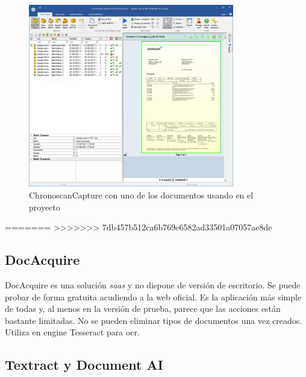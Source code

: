 \begin{figure}[hp!]
    \centering
    \includegraphics[width=0.8\textwidth]{imaxes/b-estado-arte/chronoscan-capture}
    \caption{ChronoscanCapture con uno de los documentos usando en el proyecto}
    \label{fig:chronoscan-capture}
\end{figure}
=======
>>>>>>> 7db457b512ca6b769e6582ad33501a07057ae8de

\subsection{DocAcquire}

DocAcquire \cite{solucionesComerciales_docAcquire_docAcquire} es una solución \emph{\acrlong{saas}} y no dispone de versión de escritorio. Se puede probar de forma gratuita acudiendo a la web oficial. Es la aplicación más simple de todas y, al menos en la versión de prueba, parece que las acciones están bastante limitadas. No se pueden eliminar tipos de documentos una vez creados. Utiliza en engine Tesseract para \acrshort{ocr}.

\subsection{Textract y Document AI}

